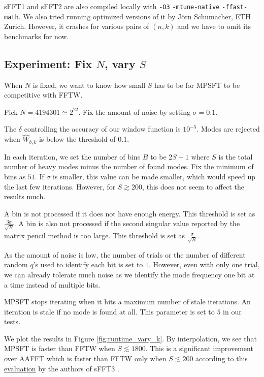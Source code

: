 \documentclass[10pt]{article}
\begin{document}
sFFT1 and sFFT2 are also compiled locally with \texttt{-O3} \texttt{-mtune-native} \texttt{-ffast-math}. We also tried running optimized versions of it by Jörn Schumacher, ETH Zurich. However, it crashes for various pairs of $(n,k)$ and we have to omit its benchmarks for now.

\subsection{Experiment: Fix $N$, vary $S$}
When $N$ is fixed, we want to know how small $S$ has to be for MPSFT to be competitive with FFTW.

Pick $N=4194301\simeq 2^{22}$. Fix the amount of noise by setting $\sigma=0.1$.

The $\delta$ controlling the accuracy of our window function is $10^{-5}$. Modes are rejected when $\hat{W}_{b,k}$ is below the threshold of $0.1$.

In each iteration, we set the number of bins $B$ to be $2S+1$ where $S$ is the total number of heavy modes minus the number of found modes. Fix the minimum of bins as $51$. If $\sigma$ is smaller, this value can be made smaller, which would speed up the last few iterations. However, for $S\gtrsim 200$, this does not seem to affect the results much.

A bin is not processed if it does not have enough energy. This threshold is set as $\frac{3\sigma}{\sqrt{B}}$. A bin is also not processed if the second singular value reported by the matrix pencil method is too large. This threshold is set as $\frac{\sigma}{\sqrt{B}}$.

As the amount of noise is low, the number of trials or the number of different random $q$'s used to identify each bit is set to $1$. However, even with only one trial, we can already tolerate much noise as we identify the mode frequency one bit at a time instead of multiple bits.

MPSFT stops iterating when it hits a maximum number of stale iterations. An iteration is stale if no mode is found at all. This parameter is set to $5$ in our tests.

We plot the results in Figure \ref{fig:runtime_vary_k}. By interpolation, we see that MPSFT is faster than FFTW when $S\lesssim 1800$. This is a significant improvement over AAFFT which is faster than FFTW only when $S \lesssim 200$ according to this \href{https://groups.csail.mit.edu/netmit/sFFT/results.html}{evaluation} by the authors of sFFT3 \cite{hassanieh2012simple}.
\end{document}
